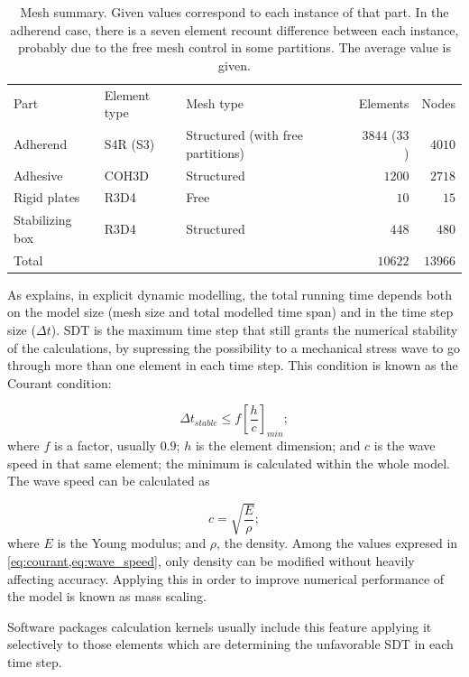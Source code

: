 \documentclass[cmfonts]{witpress}
\begin{document}
\begin{table}
	\centering
	\begin{tabular}{ll p{3cm} rr}
		Part & Element type & Mesh type & Elements & Nodes \\
		Adherend & S4R (S3) & Structured (with free partitions) & $3844$ ($33$) & $4010$ \\
		Adhesive & COH3D & Structured & $1200$ & $2718$ \\
		Rigid plates & R3D4 & Free & $10$ & $15$ \\
		Stabilizing box & R3D4 & Structured & $448$ & $480$ \\
		Total &&& $10622$ & $13966$ \\
	\end{tabular}
	\caption[Mesh summary.]{Mesh summary. Given values correspond to each instance of that part. In the adherend case, there is a seven element recount difference between each instance, probably due to the free mesh control in some partitions. The average value is given.}
	\label{tab:mesh}
\end{table}


As \cite{Hale} explains, in explicit dynamic modelling, the total running time depends both on the model size (mesh size and total modelled time span) and in the time step size (${\Delta}t$). SDT is the maximum time step that still grants the numerical stability of the calculations, by supressing the possibility to a mechanical stress wave to go through more than one element in each time step. This condition is known as the Courant condition:

\begin{equation}
{\Delta}t_{stable} \leq f \left[\frac{h}{c}\right]_{min} ;
\label{eq:courant}
\end{equation}
where $f$ is a factor, usually $0.9$; $h$ is the element dimension; and $c$ is the wave speed in that same element; the minimum is calculated within the whole model. The wave speed can be calculated as

\begin{equation}
c = \sqrt{\frac{E}{\rho}} ;
\label{eq:wave_speed}
\end{equation}
where $E$ is the Young modulus; and $\rho$, the density. Among the values expresed in \cref{eq:courant,eq:wave_speed}, only density can be modified without heavily affecting accuracy. Applying this in order to improve numerical performance of the model is known as mass scaling.

Software packages calculation kernels usually include this feature applying it selectively to those elements which are determining the unfavorable SDT in each time step.
\end{document}
